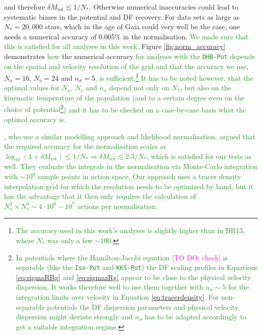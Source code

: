 \documentclass[iop,revtex4]{emulateapj}
\newcommand{\NEW}[1]{\textcolor{ForestGreen}{#1}}
\newcommand{\Wilma}[1]{\textcolor{Magenta}{#1}}
\newcommand{\OLD}[1]{}
\begin{document}
and therefore $\delta M_\text{tot} \lesssim 1/N_*$. Otherwise numerical inaccuracies could lead to systematic biases in the potential and DF recovery. For data sets as large as $N_* = 20,000$ stars, which in the age of Gaia could very well be the case, one needs a numerical accuracy of 0.005\% in the normalisation. \NEW{We made sure that this is satisfied for all analyses in this work.} Figure \ref{fig:norm_accuracy} demonstrates \NEW{how}\OLD{that} the numerical accuracy \OLD{we use in the analysis}\NEW{for analyses with the \texttt{DHB-Pot} depends on the spatial and velocity resolution of the grid and that the accuracy we use}, $N_x=16$, $N_v=24$ and $n_\sigma=5$\OLD{, does satisfy this requirement.}\NEW{, is sufficient.}\footnote{\NEW{The accuracy used in this work's analyses is slightly higher than in BR13, where $N_*$ was only a few $\sim 100$.}} \NEW{It has to be noted however, that the optimal values for $N_x$, $N_v$ and $n_\sigma$ depend not only on $N_*$, but also on the kinematic temperature of the population (and to a certain degree even on the choice of potential}\footnote{\NEW{In potentials where the Hamilton-Jacobi equation \Wilma{[TO DO: check]} is separable (like the \texttt{Iso-Pot} and \texttt{KKS-Pot}) the DF scaling profiles in Equations \eqref{eq:sigmaRRg} and \eqref{eq:sigmazRg} appear to be close to the physical velocity dispersion. It works therefore well to use them together with $n_\sigma \sim 5$ for the integration limits over velocity in Equation} \NEW{\eqref{eq:tracerdensity}. For non-separable potentials the DF dispersion parameters and physical velocity dispersion might deviate strongly and $n_\sigma$ has to be adapted accordingly to get a suitable integration regime.}}\NEW{) and it has to be checked on a case-by-case basis what the optimal accuracy is.} \OLD{This is slightly higher than in BR13, where $N_*$ was only a few $\sim 100$.}

\NEW{\citet{2013MNRAS.433.1411M}, who use a similar modelling approach and likelihood normalisation, argued that the required accuracy for the normalisation scales as $\log_{10} \left(1+\delta M_\text{tot} \right) \leq 1 / N_* \Rightarrow \delta M_\text{tot} \lesssim 2.3/N_*$, which is satisfied for our tests as well.  They evaluate the integrals in the normalisation via Monte-Carlo integration with $\sim 10^9$ sample points in action space. Our approach uses a tracer density interpolation grid for which the resolution needs to be optimized by hand, but it has the advantage that it then only requires the calculation of $N_x^2 \times N_v^3 \sim 4\cdot 10^{6} - 10^7$ actions per normalisation.}
\end{document}
